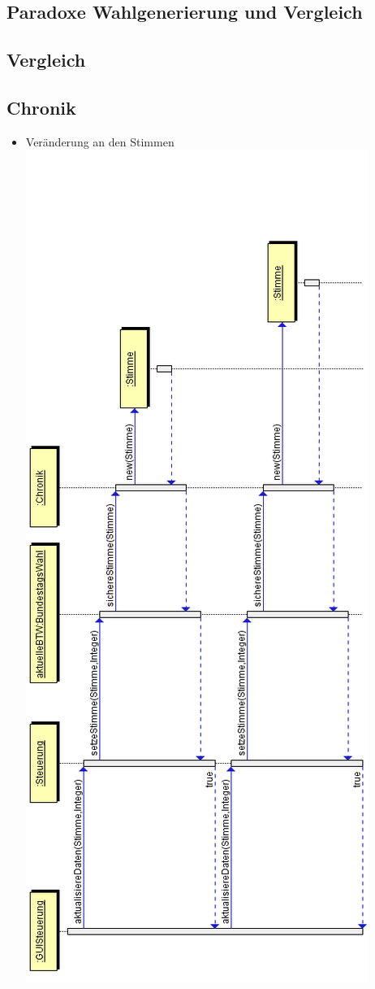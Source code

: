 \documentclass[12pt,a4paper,titlepage]{article}
\begin{document}
\subsection{Paradoxe Wahlgenerierung und Vergleich}

\subsection{Vergleich}

\subsection{Chronik}
\begin{itemize}
	\item Veränderung an den Stimmen \\
		\includegraphics[scale=0.7]{Chronik_Sequenzdiagramm-stimmenaendern.png}

\end{itemize}
\end{document}

